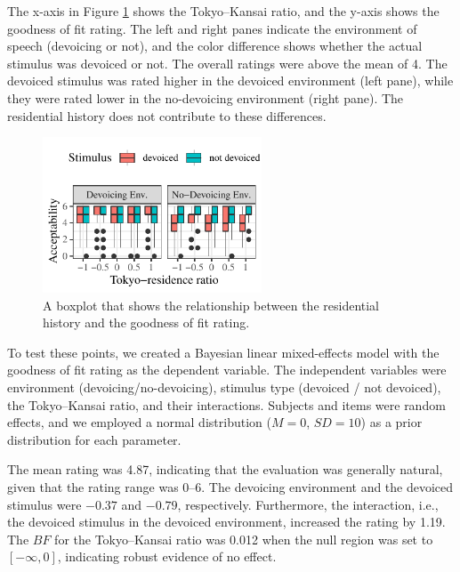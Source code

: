 \documentclass[a4paper,11pt,twocolumn]{article}
\begin{document}
The x-axis in Figure \ref{fig:cat_results} shows the Tokyo--Kansai ratio, and the y-axis shows the goodness of fit rating. The left and right panes indicate the environment of speech (devoicing or not), and the color difference shows whether the actual stimulus was devoiced or not. The overall ratings were above the mean of 4. The devoiced stimulus was rated higher in the devoiced environment (left pane), while they were rated lower in the no-devoicing environment (right pane). The residential history does not contribute to these differences.
\begin{figure}[!ht]
\begin{center}
\includegraphics[width=6.5cm]{../results/artifact/results_categorization.pdf}
\caption{A boxplot that shows the relationship between the residential history and the goodness of fit rating.}\label{fig:cat_results}
\end{center}
\end{figure}

To test these points, we created a Bayesian linear mixed-effects model with the goodness of fit rating as the dependent variable. The independent variables were environment (devoicing/no-devoicing), stimulus type (devoiced / not devoiced), the Tokyo--Kansai ratio, and their interactions. Subjects and items were random effects, and we employed a normal distribution ($M=0$, $SD=10$) as a prior distribution for each parameter.


The mean rating was 4.87, indicating that the evaluation was generally natural, given that the rating range was 0--6. The devoicing environment and the devoiced stimulus were $-0.37$ and $-0.79$, respectively. Furthermore, the interaction, i.e., the devoiced stimulus in the devoiced environment, increased the rating by 1.19. The $BF$ for the Tokyo--Kansai ratio was 0.012 when the null region was set to $[-\infty, 0]$, indicating robust evidence of no effect.
\end{document}
